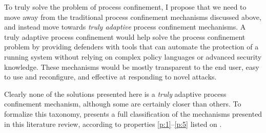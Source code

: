 \documentclass[dvipsnames, 12pt]{article}
\begin{document}
To truly solve the problem of process confinement, I propose that we need to
move away from the traditional process confinement mechanisms discussed above,
and instead move towards \textit{truly adaptive} process confinement mechanisms.
A truly adaptive process confinement would help solve the process confinement
problem by providing defenders with tools that can automate the protection of
a running system without relying on complex policy languages or advanced
security knowledge. These mechanisms would be mostly transparent to the end
user, easy to use and reconfigure, and effective at responding to novel attacks.

Clearly none of the solutions presented here is a \textit{truly} adaptive
process confinement mechanism, although some are certainly closer than others.
To formalize this taxonomy,  presents a full classification
of the mechanisms presented in this literature review, according to properties
\ref{p:1}--\ref{p:5} listed on .
\end{document}
